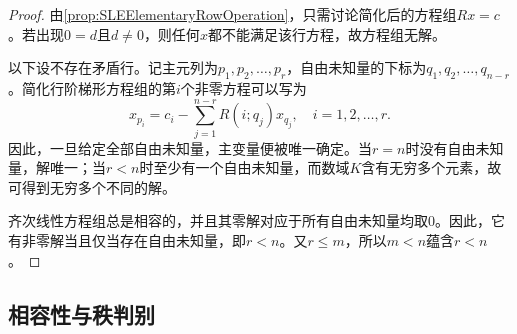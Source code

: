\begin{proof}
	由\cref{prop:SLEElementaryRowOperation}，只需讨论简化后的方程组$Rx=c$。若出现$0=d$且$d\ne0$，则任何$x$都不能满足该行方程，故方程组无解。

	以下设不存在矛盾行。记主元列为$p_1,p_2,\dots,p_r$，自由未知量的下标为$q_1,q_2,\dots,q_{n-r}$。简化行阶梯形方程组的第$i$个非零方程可以写为
	\begin{equation*}
		x_{p_i}=c_i-\sum_{j=1}^{n-r}R(i;q_j)x_{q_j},
		\quad i=1,2,\dots,r.
	\end{equation*}
	因此，一旦给定全部自由未知量，主变量便被唯一确定。当$r=n$时没有自由未知量，解唯一；当$r<n$时至少有一个自由未知量，而数域$K$含有无穷多个元素，故可得到无穷多个不同的解。

	齐次线性方程组总是相容的，并且其零解对应于所有自由未知量均取$0$。因此，它有非零解当且仅当存在自由未知量，即$r<n$。又$r\leqslant m$，所以$m<n$蕴含$r<n$。
\end{proof}

\subsection{相容性与秩判别}

